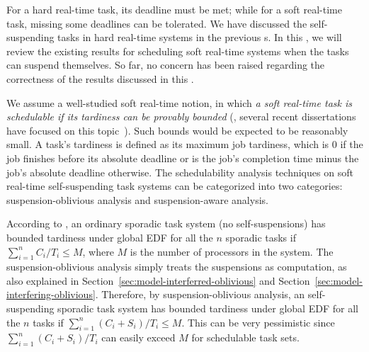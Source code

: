 \label{sec:soft-realtime}

For a hard real-time task, its deadline must be met; while for a soft real-time task, missing some deadlines can be tolerated. We have discussed the self-suspending tasks in hard real-time systems in the previous \mysectionrefnormal{}s. In this \mysectionrefnormal{}, we will review the existing results for scheduling soft real-time systems when the tasks can suspend themselves. So far, no concern has been raised regarding the correctness of the results discussed in this \mysectionrefnormal{}. 


 We assume a well-studied soft real-time notion, in which \emph{a soft real-time task is schedulable if its tardiness can be provably bounded} (\eg, several recent dissertations have focused on this topic~\cite{leontyev2010compositional, devi2006soft}). Such bounds would be expected to be reasonably small. A task's tardiness is defined as its maximum job tardiness, which is $0$ if the job finishes before its absolute deadline or is the job's completion time minus the job's absolute deadline otherwise. 
The schedulability analysis techniques on soft real-time self-suspending task systems can be categorized into two categories: suspension-oblivious analysis and suspension-aware analysis.

\label{sec:sus-oblivious-soft}

According to \cite{Devi2005,Leontyev072}, an ordinary sporadic task system (\ie no self-suspensions) has bounded tardiness under global EDF for all the $n$ sporadic tasks if $\sum_{i=1}^{n} C_i/T_i \leq M$, where $M$ is the number of processors in the system. The suspension-oblivious analysis simply treats the suspensions as computation, as also explained in Section~\ref{sec:model-interferred-oblivious} and Section~\ref{sec:model-interfering-oblivious}. Therefore, by suspension-oblivious analysis, an self-suspending sporadic task system  has bounded tardiness under global EDF for all the $n$ tasks if $\sum_{i=1}^{n} (C_i+S_i)/T_i \leq M$. This can be very pessimistic since $\sum_{i=1}^{n} (C_i+S_i)/T_i$ can easily exceed $M$ for schedulable task sets.

\label{sec:sus-aware-soft}

